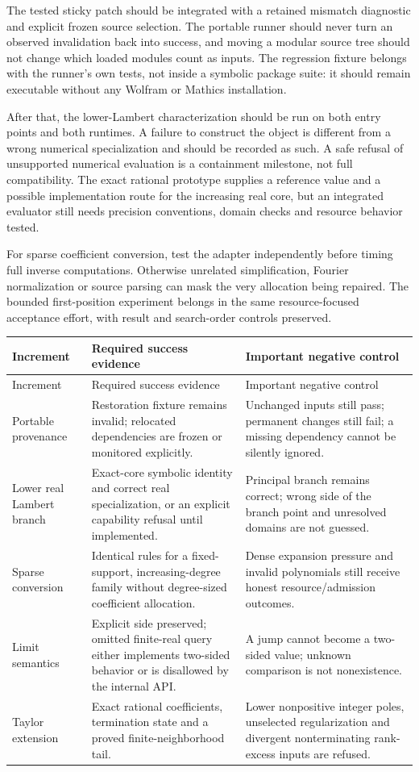 \documentclass[11pt,letterpaper]{article}
\begin{document}
The tested sticky patch should be integrated with a retained mismatch diagnostic and explicit frozen source selection. The portable runner should never turn an observed invalidation back into success, and moving a modular source tree should not change which loaded modules count as inputs. The regression fixture belongs with the runner's own tests, not inside a symbolic package suite: it should remain executable without any Wolfram or Mathics installation.

After that, the lower-Lambert characterization should be run on both entry points and both runtimes. A failure to construct the object is different from a wrong numerical specialization and should be recorded as such. A safe refusal of unsupported numerical evaluation is a containment milestone, not full compatibility. The exact rational prototype supplies a reference value and a possible implementation route for the increasing real core, but an integrated evaluator still needs precision conventions, domain checks and resource behavior tested.

For sparse coefficient conversion, test the adapter independently before timing full inverse computations. Otherwise unrelated simplification, Fourier normalization or source parsing can mask the very allocation being repaired. The bounded first-position experiment belongs in the same resource-focused acceptance effort, with result and search-order controls preserved.

\begin{longtable}{P{.20\linewidth}P{.34\linewidth}P{.37\linewidth}}
\toprule
Increment & Required success evidence & Important negative control \\
\midrule\endfirsthead
\toprule Increment & Required success evidence & Important negative control \\
\midrule\endhead
Portable provenance & Restoration fixture remains invalid; relocated dependencies are frozen or monitored explicitly. & Unchanged inputs still pass; permanent changes still fail; a missing dependency cannot be silently ignored. \\
Lower real Lambert branch & Exact-core symbolic identity and correct real specialization, or an explicit capability refusal until implemented. & Principal branch remains correct; wrong side of the branch point and unresolved domains are not guessed. \\
Sparse conversion & Identical rules for a fixed-support, increasing-degree family without degree-sized coefficient allocation. & Dense expansion pressure and invalid polynomials still receive honest resource/admission outcomes. \\
Limit semantics & Explicit side preserved; omitted finite-real query either implements two-sided behavior or is disallowed by the internal API. & A jump cannot become a two-sided value; unknown comparison is not nonexistence. \\
Taylor extension & Exact rational coefficients, termination state and a proved finite-neighborhood tail. & Lower nonpositive integer poles, unselected regularization and divergent nonterminating rank-excess inputs are refused. \\
\bottomrule
\end{longtable}
\end{document}
